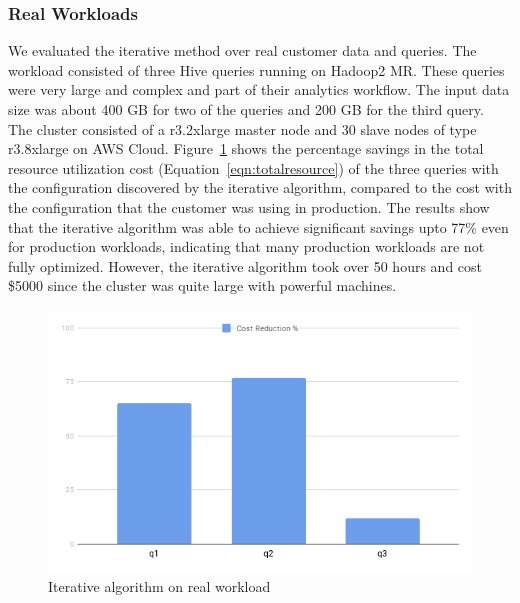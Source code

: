 \subsubsection*{Real Workloads}
We evaluated the iterative method over real customer data and queries. The workload consisted of three Hive queries running on Hadoop2 MR. These queries were very large and complex and part of their analytics workflow. The input data size was about 400 GB for two of the queries and 200 GB for the third query. The cluster consisted of a r3.2xlarge master node and 30 slave nodes of type r3.8xlarge on AWS Cloud. Figure~\ref{fig:iterativelyft} shows the percentage savings in the total resource utilization cost (Equation~\ref{eqn:totalresource}) of the three queries with the configuration discovered by the iterative algorithm, compared to the cost with the configuration that the customer was using in production. The results show that the iterative algorithm was able to achieve significant savings upto 77\% even for production workloads, indicating that many production workloads are not fully optimized. However, the iterative algorithm took over 50 hours and cost \$5000 since the cluster was quite large with powerful machines. 
\begin{figure}[h]
	\includegraphics[width=\linewidth]{fig/lyft.png}
	\caption{Iterative algorithm on real workload}
	\label{fig:iterativelyft}
\end{figure}

